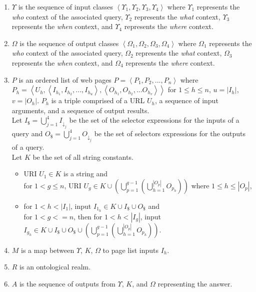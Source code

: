 \documentclass{IOS-Book-Article}
\begin{document}
\begin{enumerate}

\item $\Upsilon$ is the sequence of input classes $\left< \Upsilon_{1}, \Upsilon_{2}, \Upsilon_{3}, \Upsilon_{4} \right>$ where $\Upsilon_{1}$ represents the \emph{who} context of the associated query, $\Upsilon_{2}$ represents the \emph{what} context, $\Upsilon_{3}$ represents the \emph{when} context, and $\Upsilon_{4}$ represents the \emph{where} context.

\item $\Omega$ is the sequence of output classes $\left<\Omega_{1}, \Omega_{2}, \Omega_{3}, \Omega_{4}\right>$ where $\Omega_{1}$ represents the \emph{who} context of the associated query, $\Omega_{2}$ represents the \emph{what} context, $\Omega_{3}$ represents the \emph{when} context, and $\Omega_{4}$ represents the \emph{where} context.

\item $P$ is an ordered list of web pages $P = \left<P_1,P_2,..., P_n\right>$ where $P_h = \left<U_h,\left<I_{h_1},I_{h_2},...,I_{h_u}\right>,\left<O_{h_1},O_{h_2},...O_{h_v}\right>\right>$ for $1 \leq h \leq n$, $u = \left| I_h \right|$, $v = \left| O_h \right|$. $P_h$ is a triple comprised of a URL $U_h$, a sequence of input arguments, and a sequence of output results.
\\
Let $I_{\$} = \bigcup_{j=1}^{4} I_{\downarrow_j}$ be the set of the selector expressions for the inputs of a query and $O_{\$} = \bigcup_{j=1}^{4} O_{\downarrow_j}$ be the set of selectors expressions for the outputs of a query.
\\
Let $K$ be the set of all string constants.
\begin{itemize}
\item URI $U_1 \in K$ is a string and \\
for $1 < g \leq n$, URI $U_g \in K \cup \left( \bigcup^{g-1}_{p=1} \left( \bigcup^{\left|O_p\right|}_{h=1}O_{p_h} \right)\right)$ where $1 \leq h \leq \left| O_p \right| $,

\item for $1 < h < \left| I_1 \right|$, input $I_{1_h} \in K \cup I_{\$} \cup O_{\$}$ and \\
for $1 < g <= n$, then for $1 < h < \left| I_g \right|$, input $I_{g_h} \in K \cup I_{\$} \cup O_{\$} \cup \left( \bigcup^{g-1}_{p=1} \left( \bigcup^{\left|O_p\right|}_{h=1}O_{p_h} \right)\right)$.
\end{itemize}

\item $M$ is a map between $\Upsilon$, $K$, $\Omega$ to page list inputs $I_h$.

\item $R$ is an ontological realm. 

\item $A$ is the sequence of outputs from $\Upsilon$, $K$, and $\Omega$ representing the answer.

\end{enumerate}
\end{document}
